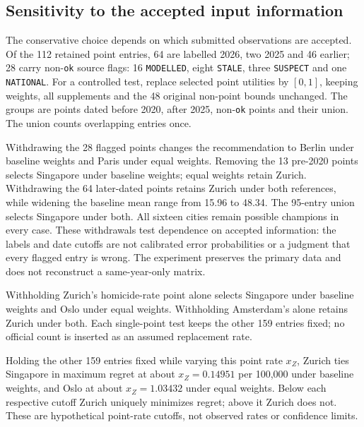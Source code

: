 \subsection{Sensitivity to the accepted input information}\label{sec:sourcepolicy}
The conservative choice depends on which submitted observations are accepted.
Of the 112 retained point entries, 64 are labelled 2026, two 2025 and 46 earlier;
28 carry non-\texttt{ok} source flags: 16 \texttt{MODELLED}, eight \texttt{STALE},
three \texttt{SUSPECT} and one \texttt{NATIONAL}.
For a controlled test, replace selected point utilities by $[0,1]$, keeping
weights, all supplements and the 48 original non-point bounds unchanged.
The groups are points dated before 2020, after 2025, non-\texttt{ok} points and
their union. The union counts overlapping entries once.



Withdrawing the 28 flagged points changes the recommendation to Berlin under
baseline weights and Paris under equal weights. Removing the 13 pre-2020 points
selects Singapore under baseline weights; equal weights retain Zurich.
Withdrawing the 64 later-dated points retains Zurich under both references,
while widening the baseline mean range from 15.96 to 48.34. The 95-entry union
selects Singapore under both. All sixteen cities remain possible champions
in every case. These withdrawals test dependence on accepted information:
the labels and date cutoffs are not calibrated error probabilities or a
judgment that every flagged entry is wrong. The experiment preserves the
primary data and does not reconstruct a same-year-only matrix.

Withholding Zurich's homicide-rate point alone selects Singapore under baseline
weights and Oslo under equal weights. Withholding Amsterdam's alone retains
Zurich under both. Each single-point test keeps the other 159 entries fixed;
no official count is inserted as an assumed replacement rate.

Holding the other 159 entries fixed while varying this point rate $x_Z$, Zurich ties Singapore in maximum regret at about $x_Z=0.14951$ per 100,000 under baseline weights, and Oslo at about $x_Z=1.03432$ under equal weights. Below each respective cutoff Zurich uniquely minimizes regret; above it Zurich does not. These are hypothetical point-rate cutoffs, not observed rates or confidence limits.

